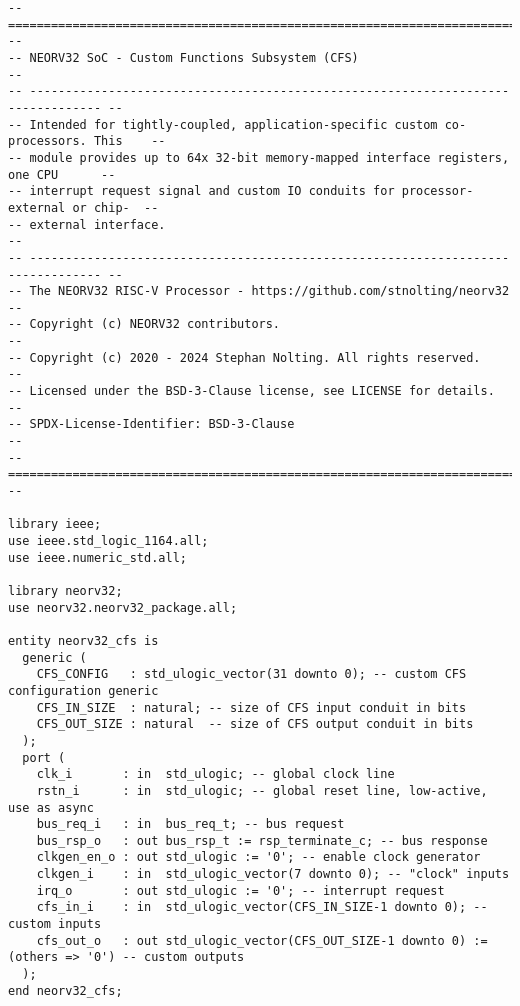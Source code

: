 \begin{code}
\begin{verbatim}
-- ================================================================================ --
-- NEORV32 SoC - Custom Functions Subsystem (CFS)                                   --
-- -------------------------------------------------------------------------------- --
-- Intended for tightly-coupled, application-specific custom co-processors. This    --
-- module provides up to 64x 32-bit memory-mapped interface registers, one CPU      --
-- interrupt request signal and custom IO conduits for processor-external or chip-  --
-- external interface.                                                              --
-- -------------------------------------------------------------------------------- --
-- The NEORV32 RISC-V Processor - https://github.com/stnolting/neorv32              --
-- Copyright (c) NEORV32 contributors.                                              --
-- Copyright (c) 2020 - 2024 Stephan Nolting. All rights reserved.                  --
-- Licensed under the BSD-3-Clause license, see LICENSE for details.                --
-- SPDX-License-Identifier: BSD-3-Clause                                            --
-- ================================================================================ --

library ieee;
use ieee.std_logic_1164.all;
use ieee.numeric_std.all;

library neorv32;
use neorv32.neorv32_package.all;

entity neorv32_cfs is
  generic (
    CFS_CONFIG   : std_ulogic_vector(31 downto 0); -- custom CFS configuration generic
    CFS_IN_SIZE  : natural; -- size of CFS input conduit in bits
    CFS_OUT_SIZE : natural  -- size of CFS output conduit in bits
  );
  port (
    clk_i       : in  std_ulogic; -- global clock line
    rstn_i      : in  std_ulogic; -- global reset line, low-active, use as async
    bus_req_i   : in  bus_req_t; -- bus request
    bus_rsp_o   : out bus_rsp_t := rsp_terminate_c; -- bus response
    clkgen_en_o : out std_ulogic := '0'; -- enable clock generator
    clkgen_i    : in  std_ulogic_vector(7 downto 0); -- "clock" inputs
    irq_o       : out std_ulogic := '0'; -- interrupt request
    cfs_in_i    : in  std_ulogic_vector(CFS_IN_SIZE-1 downto 0); -- custom inputs
    cfs_out_o   : out std_ulogic_vector(CFS_OUT_SIZE-1 downto 0) := (others => '0') -- custom outputs
  );
end neorv32_cfs;


\end{verbatim}
\end{code}
